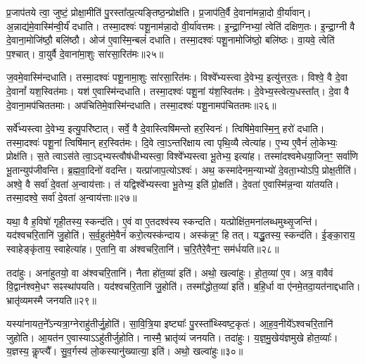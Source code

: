 प्र॒जा\-प॑तये त्वा॒ जुष्टं॒ प्रोक्षा॒मीति॑ पु॒रस्ता᳚त्प्र॒त्यङ्तिष्ठ॒न्प्रोक्ष॑ति।
प्र॒जा\-प॑ति॒र्वै दे॒वाना॑मन्ना॒दो वी॒र्या॑वान्।
अ॒न्नाद्य॑मे॒वास्मि॑न्वी॒र्यं॑ दधाति।
तस्मा॒दश्वः॑ पशू॒नाम॑न्ना॒दो वी॒र्या॑वत्तमः।
इ॒न्द्रा॒ग्निभ्यां॒ त्वेति॑ दक्षिण॒तः।
इ॒न्द्रा॒ग्नी वै दे॒वाना॒मोजि॑ष्ठौ॒ बलि॑ष्ठौ।
ओज॑ ए॒वास्मि॒न्बलं॑ दधाति।
तस्मा॒दश्वः॑ पशू॒नामोजि॑ष्ठो॒ बलि॑ष्ठः।
वा॒यवे॒ त्वेति॑ प॒श्चात्।
वा॒युर्वै दे॒वाना॑मा॒शुः सा॑रसा॒रित॑मः॥२५॥

ज॒वमे॒वास्मि॑न्दधाति।
तस्मा॒दश्वः॑ पशू॒नामा॒शुः सा॑रसा॒रित॑मः।
विश्वे᳚भ्यस्त्वा दे॒वेभ्य॒ इत्यु॑त्तर॒तः।
विश्वे॒ वै दे॒वा दे॒वानां᳚ यश॒स्वित॑माः।
यश॑ ए॒वास्मि॑न्दधाति।
तस्मा॒दश्वः॑ पशू॒नां य॑श॒स्वित॑मः।
दे॒वेभ्य॒स्त्वेत्य॒धस्ता᳚त्।
दे॒वा वै दे॒वाना॒मप॑चिततमाः।
अप॑चितिमे॒वास्मि॑न्दधाति।
तस्मा॒दश्वः॑ पशू॒नामप॑चिततमः॥२६॥

सर्वे᳚भ्यस्त्वा दे॒वेभ्य॒ इत्यु॒परि॑ष्टात्।
सर्वे॒ वै दे॒वास्त्विषि॑मन्तो हर॒स्विनः॑।
त्विषि॑मे॒वास्मि॒न्॒ हरो॑ दधाति।
तस्मा॒दश्वः॑ पशू॒नां त्विषि॑मान्‌ हर॒स्वित॑मः।
दि॒वे त्वा॒\-ऽन्तरि॑क्षाय त्वा पृथि॒व्यै त्वेत्या॑ह।
ए॒भ्य ए॒वैनं॑ लो॒केभ्यः॒ प्रोक्ष॑ति।
स॒ते त्वा\-ऽस॑ते त्वा॒\-ऽद्भ्यस्त्वौष॑धीभ्यस्त्वा॒ विश्वे᳚भ्यस्त्वा भू॒तेभ्य॒ इत्या॑ह।
तस्मा॑दश्वमेधया॒जिन॒ꣳ॒ सर्वा॑णि भू॒तान्युप॑जीवन्ति।
ब्र॒ह्म॒वा॒दिनो॑ वदन्ति।
यत्प्रा॑जाप॒त्यो\-ऽश्वः॑।
अथ॒ कस्मा॑देनम॒न्याभ्यो॑ दे॒वता॒भ्योऽपि॒ प्रोक्ष॒तीति॑।
अश्वे॒ वै सर्वा॑ दे॒वता॑ अ॒न्वाय॑त्ताः।
तं यद्विश्वे᳚भ्यस्त्वा भू॒तेभ्य॒ इति॑ प्रो॒क्षति॑।
दे॒वता॑ ए॒वास्मि॑न्न॒न्वा या॑तयति।
तस्मा॒दश्वे॒ सर्वा॑ दे॒वता॑ अ॒न्वाय॑त्ताः॥२७॥\anuvakamend[सा॒र॒सा॒रित॒मो\-ऽप॑चिततमः प्राजाप॒त्यो\-ऽश्वः॒ पञ्च॑ च]

यथा॒ वै ह॒विषो॑ गृही॒तस्य॒ स्कन्द॑ति।
ए॒वं वा ए॒तदश्व॑स्य स्कन्दति।
यत्प्रोक्षि॑त॒मना॑लब्धमुथ्सृ॒जन्ति॑।
यद॑श्वचरि॒तानि॑ जु॒होति॑।
स॒र्व॒हुत॑मे॒वैनं॑ करो॒त्यस्क॑न्दाय।
अस्क॑न्न॒ꣳ॒ हि तत्।
यद्धु॒तस्य॒ स्कन्द॑ति।
ई॒ङ्का॒राय॒ स्वाहेङ्कृ॑ताय॒ स्वाहेत्या॑ह।
ए॒तानि॒ वा अ॑श्वचरि॒तानि॑।
च॒रि॒तैरे॒वैन॒ꣳ॒ सम॑र्धयति॥२८॥

तदा॑हुः।
अना॑हुतयो॒ वा अ॑श्वचरि॒तानि॑।
नैता हो॑त॒व्या॑ इति॑।
अथो॒ खल्वा॑हुः।
हो॒त॒व्या॑ ए॒व।
अत्र॒ वावैवं वि॒द्वान॑श्वमे॒धꣳ सꣴस्था॑पयति।
यद॑श्वचरि॒तानि॑ जु॒होति॑।
तस्मा᳚द्धोत॒व्या॑ इति॑।
ब॒हि॒र्धा वा ए॑नमे॒तदा॒यत॑नाद्दधाति।
भ्रातृ॑व्यमस्मै जनयति॥२९॥

यस्या॑नायत॒ने᳚\-ऽन्यत्रा॒ग्नेराहु॑तीर्जु॒होति॑।
सा॒वि॒त्रि॒या इष्ट्याः᳚ पु॒रस्ता᳚थ्स्विष्ट॒कृतः॑।
आ॒ह॒व॒नीये᳚\-ऽश्वचरि॒तानि॑ जुहोति।
आ॒यत॑न ए॒वास्याऽऽहु॑तीर्जुहोति।
नास्मै॒ भ्रातृ॑व्यं जनयति।
तदा॑हुः।
य॒ज्ञ॒\-मु॒खेय॑ज्ञमुखे होत॒व्याः᳚।
य॒ज्ञस्य॒ कॢप्त्यै᳚।
सु॒व॒र्गस्य॑ लो॒कस्यानु॑ख्यात्या॒ इति॑।
अथो॒ खल्वा॑हुः॥३०॥

